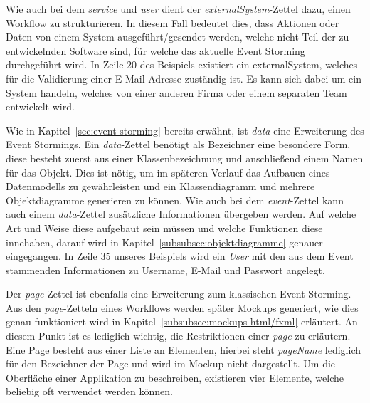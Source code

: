 
Wie auch bei dem \textit{service} und \textit{user} dient der \textit{externalSystem}-Zettel dazu, einen Workflow zu strukturieren.
In diesem Fall bedeutet dies, dass Aktionen oder Daten von einem System ausgeführt/gesendet werden, welche nicht Teil der zu entwickelnden
Software sind, für welche das aktuelle Event Storming durchgeführt wird.
In Zeile 20 des Beispiels existiert ein externalSystem, welches für die Validierung einer E-Mail-Adresse zuständig ist.
Es kann sich dabei um ein System handeln, welches von einer anderen Firma oder einem separaten Team entwickelt wird.


Wie in Kapitel~\ref{sec:event-storming} bereits erwähnt, ist \textit{data} eine Erweiterung des Event Stormings.
Ein \textit{data}-Zettel benötigt als Bezeichner eine besondere Form, diese besteht zuerst aus einer Klassenbezeichnung und anschließend einem Namen für das Objekt.
Dies ist nötig, um im späteren Verlauf das Aufbauen eines Datenmodells zu gewährleisten und ein Klassendiagramm und mehrere Objektdiagramme generieren zu können.
Wie auch bei dem \textit{event}-Zettel kann auch einem \textit{data}-Zettel zusätzliche Informationen übergeben werden.
Auf welche Art und Weise diese aufgebaut sein müssen und welche Funktionen diese innehaben, darauf wird in Kapitel~\ref{subsubsec:objektdiagramme} genauer eingegangen.
In Zeile 35 unseres Beispiels wird ein \textit{User} mit den aus dem Event stammenden Informationen zu Username, E-Mail und Passwort angelegt.


Der \textit{page}-Zettel ist ebenfalls eine Erweiterung zum klassischen Event Storming.
Aus den \textit{page}-Zetteln eines Workflows werden später Mockups generiert, wie dies genau funktioniert wird in Kapitel~\ref{subsubsec:mockups-html/fxml} erläutert.
An diesem Punkt ist es lediglich wichtig, die Restriktionen einer \textit{page} zu erläutern.
Eine Page besteht aus einer Liste an Elementen, hierbei steht \textit{pageName} lediglich für den Bezeichner der Page und wird im Mockup nicht dargestellt.
Um die Oberfläche einer Applikation zu beschreiben, existieren vier Elemente, welche beliebig oft verwendet werden können.

